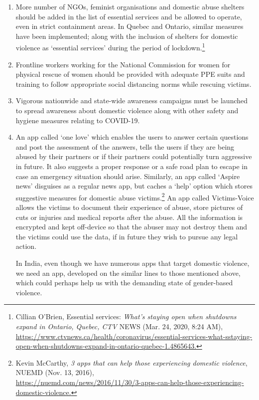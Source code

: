 \begin{multicols}{2}
\begin{enumerate}
\item More number of NGOs, feminist organisations and domestic abuse shelters should be
added in the list of essential services and be allowed to operate, even in strict
containment areas. In Quebec and Ontario, similar measures have been implemented;
along with the inclusion of shelters for domestic violence as ‘essential services’
during the period of lockdown.\footnote{Cillian O’Brien, Essential services: \textit{What's staying open when shutdowns expand in Ontario, Quebec, CTV}
NEWS (Mar. 24, 2020, 8:24 AM),\\ \url{https://www.ctvnews.ca/health/coronavirus/essential-services-what-sstaying-open-when-shutdowns-expand-in-ontario-quebec-1.4865643.}}

\item Frontline workers working for the National Commission for women for physical
rescue of women should be provided with adequate PPE suits and training to follow
appropriate social distancing norms while rescuing victims.

\item Vigorous nationwide and state-wide awareness campaigns must be launched to spread
awareness about domestic violence along with other safety and hygiene measures
relating to COVID-19. 

\item An app called ‘one love’ which enables the users to answer certain questions and post
the assessment of the answers, tells the users if they are being abused by their partners
or if their partners could potentially turn aggressive in future. It also suggests a proper
response or a safe road plan to escape in case an emergency situation should arise.
Similarly, an app called ‘Aspire news’ disguises as a regular news app, but caches a
‘help’ option which stores suggestive measures for domestic abuse victims.\footnote{Kevin McCarthy, \textit{3 apps that can help those experiencing domestic violence}, NUEMD (Nov. 13, 2016),\\
\url{https://nuemd.com/news/2016/11/30/3-apps-can-help-those-experiencing-domestic-violence.}} An app
called Victims-Voice allows the victims to document their experience of abuse, store
pictures of cuts or injuries and medical reports after the abuse. All the information is
encrypted and kept off-device so that the abuser may not destroy them and the victims
could use the data, if in future they wish to pursue any legal action.

In India, even though we have numerous apps that target domestic violence, we need
an app, developed on the similar lines to those mentioned above, which could perhaps
help us with the demanding state of gender-based violence.


\end{enumerate}
\end{multicols}
